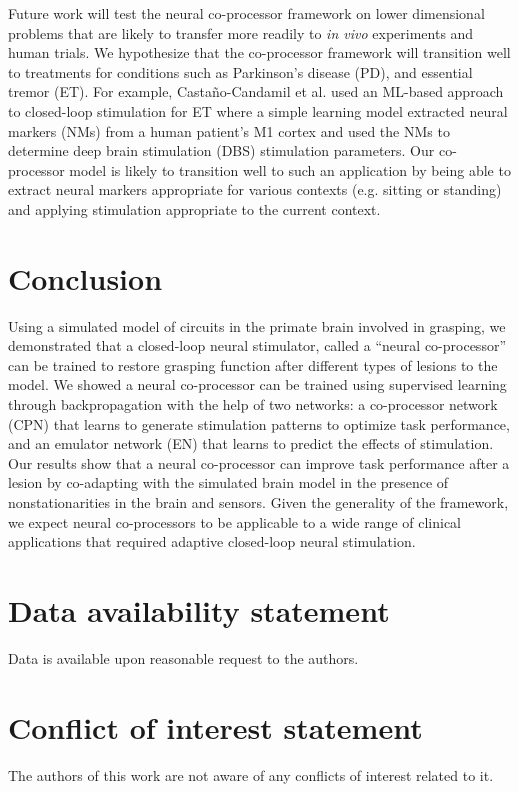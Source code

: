 \documentclass[12pt]{iopart}
\begin{document}
Future work will test the neural co-processor framework on  lower dimensional
problems that are likely to transfer more readily to \textit{in vivo} experiments
and human trials. We hypothesize that the co-processor framework will transition well
to treatments for conditions such as Parkinson's disease (PD), and essential tremor
(ET). For example, Castaño-Candamil et al. \cite{castano.pd} used an ML-based approach
to closed-loop stimulation for ET where a simple learning model extracted neural
markers (NMs) from a human patient's M1 cortex and used the NMs to determine deep
brain stimulation (DBS) stimulation parameters. Our co-processor model is
likely to transition well to such an application by being able to extract neural
markers appropriate for various contexts (e.g. sitting or standing) and applying 
stimulation appropriate to the current context.

\section{Conclusion}
Using a simulated model of circuits in the primate brain involved in grasping, we
demonstrated that a closed-loop neural stimulator, called a ``neural co-processor''
can be trained to restore grasping function after different types of lesions to the
model. We showed a neural co-processor can be  trained using supervised learning
through backpropagation with the help of two networks: a co-processor network (CPN)
that learns to generate stimulation patterns to optimize task performance, and an
emulator network (EN) that learns to predict the effects of stimulation. Our results
show that a neural co-processor can improve task performance after a lesion by
co-adapting with the simulated brain model in the presence of nonstationarities in the
brain and sensors. Given the generality of the framework, we expect neural
co-processors  to be applicable to a wide range of clinical applications that
required adaptive closed-loop neural stimulation.

\section{Data availability statement}
Data is available upon reasonable request to the authors.

\section{Conflict of interest statement}
The authors of this work are not aware of any conflicts of interest
related to it.
\end{document}
